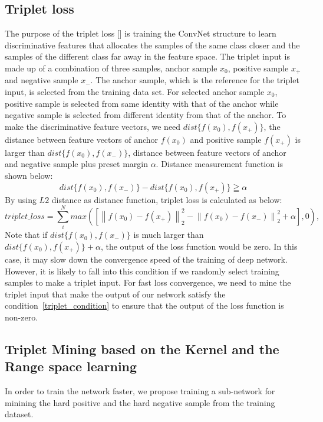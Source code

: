 \subsection{Triplet loss}
The purpose of the triplet loss [] is training the ConvNet structure to learn discriminative features that allocates the samples of the same class closer and the samples of the different class far away in the feature space.
The triplet input is made up of a combination of three samples, anchor sample $x_0$, positive sample $x_+$ and negative sample $x_-$. The anchor sample, which is the reference for the triplet input, is selected from the training data set. For selected anchor sample $x_0$, positive sample is selected from same identity with that of the anchor while negative sample is selected from different identity from that of the anchor.
To make the discriminative feature vectors, we need $dist\{f(x_0),f(x_+)\}$, the distance  between feature vectors of anchor $f(x_0)$ and positive sample $f(x_+)$ is larger than $dist\{f(x_0),f(x_-)\}$, distance between feature vectors of anchor and negative sample  plus preset margin $\alpha$. 
Distance measurement function is shown below:
\begin{equation}
    dist\{f(x_0),f(x_-)\} - dist\{f(x_0),f(x_+)\} \geqq \alpha
    \label{triplet_condition}
\end{equation}
By using $L2$ distance as distance function, triplet loss is calculated as below:
\begin{equation}
    triplet\_loss = \sum_i^N max\left({ \left[ {\left\| {{f(x_0)} - {f(x_+)}} \right\|_2^2} - {\left\| {{f(x_0)} - {f(x_-)}} \right\|_2^2}  + \alpha \right]},0 \right),
    \label{triplet_loss}
\end{equation}
Note that if $dist\{f(x_0),f(x_-)\}$ is much larger than $dist\{f(x_0),f(x_+)\} + \alpha$, the output of the loss function would be zero. In this case, it may slow down the convergence speed of the training of deep network. However, it is likely to fall into this condition if we randomly select training samples to make a triplet input. For fast loss convergence, we need to mine the triplet input that make the output of our network satisfy the condition~\ref{triplet_condition} to ensure that the output of the loss function is non-zero.

\subsection{Triplet Mining based on the Kernel and the Range space learning}
In order to train the network faster, we propose training a sub-network for minining the hard positive and the hard negative sample from the training dataset.

